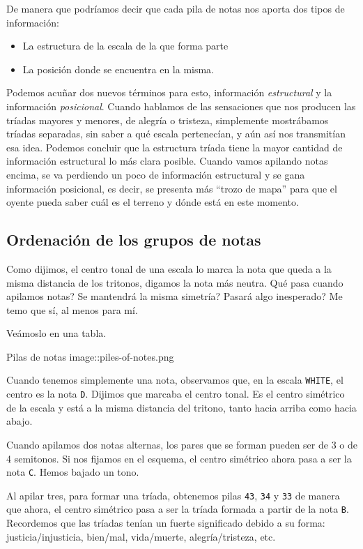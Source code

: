 \documentclass[]{article}
\providecommand{\tightlist}{%
  \setlength{
\itemsep}{0pt}\setlength{\parskip}{0pt}}
\begin{document}
De manera que podríamos decir que cada pila de notas nos aporta dos tipos de información:

\begin{itemize}   \tightlist
  \item La estructura de la escala de la que forma parte
  \item La posición donde se encuentra en la misma.
\end{itemize}

Podemos acuñar dos nuevos términos para esto, información \emph{estructural} y la información \emph{posicional}. Cuando hablamos de las sensaciones que nos producen las tríadas mayores y menores, de alegría o tristeza, simplemente mostrábamos tríadas separadas, sin saber a qué escala pertenecían, y aún así nos transmitían esa idea. Podemos concluir que la estructura tríada tiene la mayor cantidad de información estructural lo más clara posible. Cuando vamos apilando notas encima, se va perdiendo un poco de información estructural y se gana información posicional, es decir, se presenta más ``trozo de mapa'' para que el oyente pueda saber cuál es el terreno y dónde está en este momento.

\subsection{Ordenación de los grupos de notas}

Como dijimos, el centro tonal de una escala lo marca la nota que queda a la misma distancia de los tritonos, digamos la nota más neutra. Qué pasa cuando apilamos notas? Se mantendrá la misma simetría? Pasará algo inesperado? Me temo que sí, al menos para mí.

Veámoslo en una tabla.

Pilas de notas image::piles-of-notes.png

Cuando tenemos simplemente una nota, observamos que, en la escala \texttt{WHITE}, el centro es la nota \texttt{D}. Dijimos que marcaba el centro tonal. Es el centro simétrico de la escala y está a la misma distancia del tritono, tanto hacia arriba como hacia abajo.

Cuando apilamos dos notas alternas, los pares que se forman pueden ser de 3 o de 4 semitonos. Si nos fijamos en el esquema, el centro simétrico ahora pasa a ser la nota \texttt{C}. Hemos bajado un tono.

Al apilar tres, para formar una tríada, obtenemos pilas \texttt{43}, \texttt{34} y \texttt{33} de manera que ahora, el centro simétrico pasa a ser la tríada formada a partir de la nota \texttt{B}. Recordemos que las tríadas tenían un fuerte significado debido a su forma: justicia/injusticia, bien/mal, vida/muerte, alegría/tristeza, etc.
\end{document}
